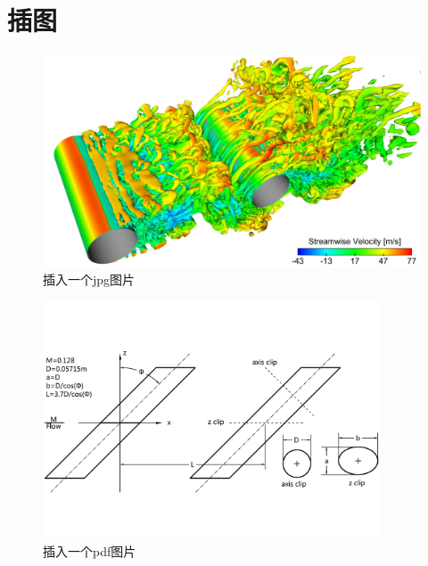 \section{插图}
\label{sec:fig}


\begin{figure}
\centering
   \includegraphics[width=12cm]{./img/visual_jpg}
  \caption{插入一个jpg图片}
  \label{fig:visual}
\end{figure}

\begin{figure}
\centering
   \includegraphics[width=10cm]{./img/Geom_pdf}
  \caption{插入一个pdf图片}
  \label{fig:visual}
\end{figure}

